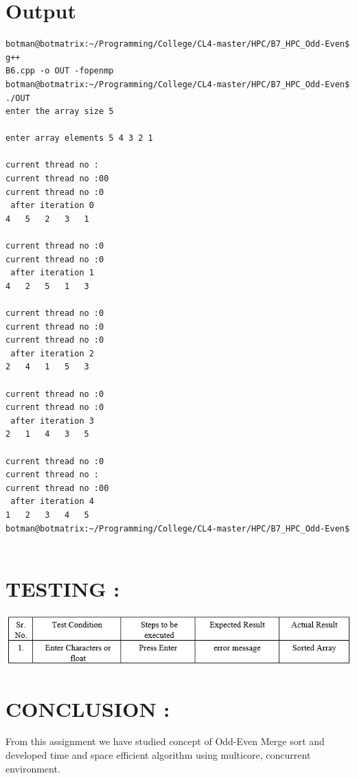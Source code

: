 \documentclass[10pt,a4paper]{article}
\begin{document}
\section{Output}
\begin{lstlisting}
botman@botmatrix:~/Programming/College/CL4-master/HPC/B7_HPC_Odd-Even$ g++ 
B6.cpp -o OUT -fopenmp
botman@botmatrix:~/Programming/College/CL4-master/HPC/B7_HPC_Odd-Even$ ./OUT
enter the array size 5

enter array elements 5 4 3 2 1

current thread no :
current thread no :00
current thread no :0
 after iteration 0 
4	5	2	3	1	

current thread no :0
current thread no :0
 after iteration 1 
4	2	5	1	3	

current thread no :0
current thread no :0
current thread no :0
 after iteration 2 
2	4	1	5	3	

current thread no :0
current thread no :0
 after iteration 3 
2	1	4	3	5	

current thread no :0
current thread no :
current thread no :00
 after iteration 4 
1	2	3	4	5	
botman@botmatrix:~/Programming/College/CL4-master/HPC/B7_HPC_Odd-Even$ 


\end{lstlisting}

\section{TESTING :}
\includegraphics[width=\textwidth]{oddeven_negative}
			
\section{CONCLUSION : }
	From this assignment we have studied concept of Odd-Even Merge sort and developed time and space efficient algorithm using multicore, concurrent environment. 
\end{document}

